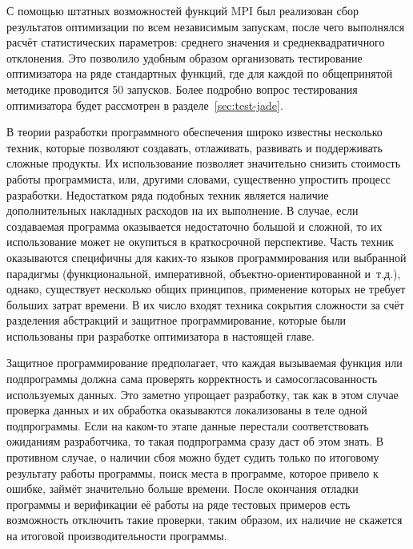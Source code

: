 С помощью штатных возможностей функций MPI был реализован сбор
результатов оптимизации по всем независимым запускам, после чего
выполнялся расчёт статистических параметров: среднего значения и
среднеквадратичного отклонения. Это позволило удобным образом
организовать тестирование оптимизатора на ряде стандартных функций,
где для каждой по общепринятой методике проводится 50 запусков.
 Более подробно вопрос тестирования оптимизатора
будет рассмотрен в разделе~\ref{sec:test-jade}.

В теории разработки программного обеспечения широко известны несколько
техник, которые позволяют создавать, отлаживать, развивать и
поддерживать сложные продукты.  Их использование позволяет
значительно снизить стоимость работы программиста, или, другими
словами, существенно упростить процесс разработки.  Недостатком ряда
подобных техник является наличие дополнительных накладных расходов на
их выполнение.  В случае, если создаваемая программа оказывается
недостаточно большой и сложной, то их использование может не окупиться
в краткосрочной перспективе.  Часть техник оказываются специфичны для
каких-то языков программирования или выбранной парадигмы
(функциональной, императивной, объектно-ориентированной и~т.д.),
однако, существует несколько общих принципов, применение которых не
требует больших затрат времени. В их число входят техника сокрытия
сложности за счёт разделения абстракций и защитное программирование,
которые были использованы при разработке оптимизатора в настоящей
главе.

Защитное программирование предполагает, что каждая вызываемая функция
или подпрограммы должна сама проверять корректность и
самосогласованность используемых данных. Это заметно упрощает
разработку, так как в этом случае проверка данных и их обработка
оказываются локализованы в теле одной подпрограммы. Если на
каком-то этапе данные перестали соответствовать ожиданиям
разработчика, то такая подпрограмма сразу даст об этом знать. В
противном случае, о наличии сбоя можно будет судить только по
итоговому результату работы программы, поиск места в программе,
которое привело к ошибке, займёт значительно больше времени. После
окончания отладки программы и верификации её работы на ряде тестовых
примеров есть возможность отключить такие проверки, таким образом, их
наличие не скажется на итоговой производительности программы.

